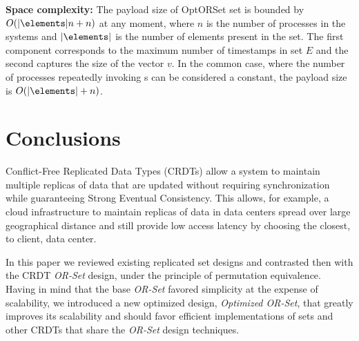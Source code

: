 \documentclass[a4paper]{article}
\begin{document}
{\bf Space complexity:} The payload size of \mbox{OptORSet} set is bounded
by $O(|\elements| n + n)$ at any moment, where $n$ is the number of
processes in the systems and $|\elements|$ is the number of elements present
in the set.  The first component corresponds to the maximum number of
timestamps in set $E$ and the second captures the size of the vector $v$.
In the common case, where the number of processes repeatedly invoking
\add{}s can be considered a constant, the payload size is $O(|\elements| +
n)$.

\section{Conclusions}

Conflict-Free Replicated Data Types (CRDTs) allow a system to maintain
multiple replicas of data that are updated without requiring synchronization
while guaranteeing Strong Eventual Consistency.  This allows, for example, a
cloud infrastructure to maintain replicas of data in data centers spread over
large geographical distance and still provide low access latency by choosing
the closest, to client, data center.

In this paper we reviewed existing replicated set designs and contrasted then
with the CRDT \emph{OR-Set} design, under the principle of permutation
equivalence. Having in mind that the base \emph{OR-Set} favored simplicity at the
expense of scalability, we introduced a new optimized design, \emph{Optimized
OR-Set}, that greatly improves its scalability and should favor efficient
implementations of sets and other CRDTs that share the \emph{OR-Set} design
techniques. 


{
\footnotesize
\newcommand{\textcommabelow}[1]{\c{#1}}


}
\end{document}
